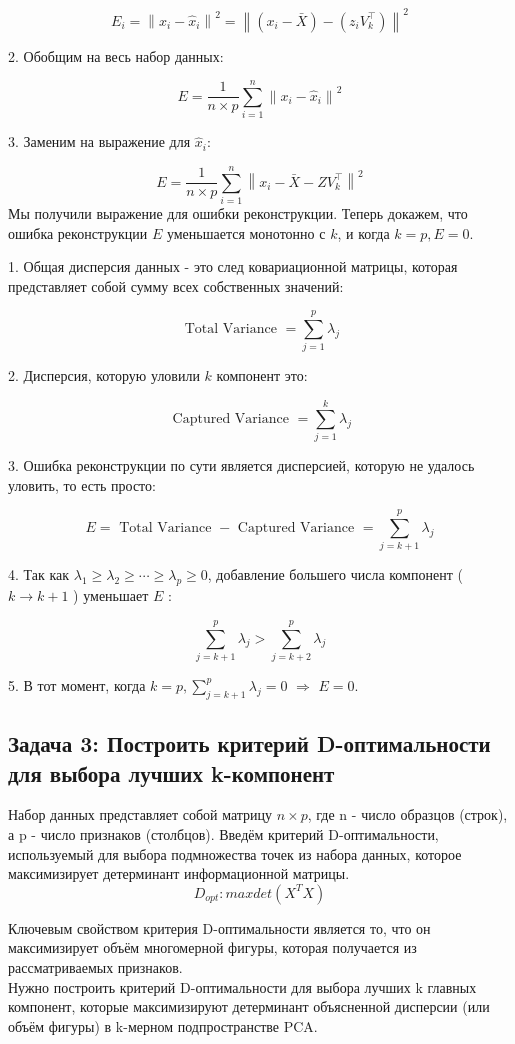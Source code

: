 $$
E_i=\left\|x_i-\hat{x}_i\right\|^2=\left\|\left(x_i-\bar{X}\right)-\left(z_i V_k^{\top}\right)\right\|^2
$$

2. Обобщим на весь набор данных:

$$
E=\frac{1}{n \times p} \sum_{i=1}^n\left\|x_i-\hat{x}_i\right\|^2
$$

3. Заменим на выражение для $\hat{x}_i$:

$$
E=\frac{1}{n \times p} \sum_{i=1}^n\left\|x_i-\bar{X}-Z V_k^{\top}\right\|^2
$$
Мы получили выражение для ошибки реконструкции. Теперь докажем, что 
ошибка реконструкции $E$ уменьшается монотонно с $k$, и когда $k=p, E=0$.

1. Общая дисперсия данных - это след ковариационной матрицы, которая представляет собой сумму всех собственных значений:

$$
\text { Total Variance }=\sum_{j=1}^p \lambda_j
$$

2. Дисперсия, которую уловили $k$ компонент это:

$$
\text { Captured Variance }=\sum_{j=1}^k \lambda_j
$$

3. Ошибка реконструкции по сути является дисперсией, которую не удалось уловить, то есть просто:

$$
E=\text { Total Variance }- \text { Captured Variance }=\sum_{j=k+1}^p \lambda_j
$$

4. Так как $\lambda_1 \geq \lambda_2 \geq \cdots \geq \lambda_p \geq 0$, добавление большего числа компонент ( $k \rightarrow k+1$ ) уменьшает $E$ :

$$
\sum_{j=k+1}^p \lambda_j>\sum_{j=k+2}^p \lambda_j
$$

5. В тот момент, когда $k=p, \sum_{j=k+1}^p \lambda_j=0$ $\Rightarrow$ $E=0$.

\subsection{Задача 3: Построить критерий D-оптимальности для выбора лучших k-компонент }
Набор данных представляет собой матрицу $n \times p$, где n - число образцов (строк), а p - число признаков (столбцов). Введём критерий D-оптимальности, используемый для выбора подмножества точек из набора данных, которое максимизирует детерминант информационной матрицы.
$$
D_{opt} : max  det(X^{T}X)
$$

Ключевым свойством критерия D-оптимальности является то, что он максимизирует объём многомерной фигуры, которая получается из рассматриваемых признаков. \\
Нужно построить критерий D-оптимальности для выбора лучших 
k главных компонент, которые максимизируют детерминант объясненной дисперсии (или объём фигуры) в k-мерном подпространстве PCA. 

